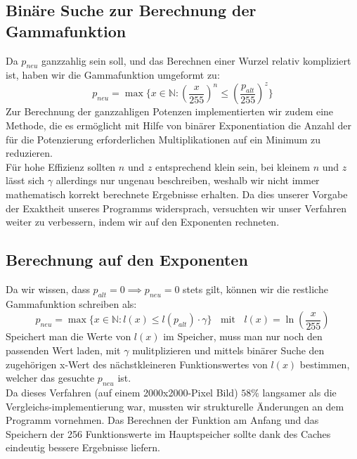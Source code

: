 \documentclass[course=erap]{aspdoc}
\begin{document}
	\subsection{Binäre Suche zur Berechnung der Gammafunktion}
	Da $p_{neu}$ ganzzahlig sein soll, und das Berechnen einer Wurzel relativ kompliziert ist, haben wir die Gammafunktion umgeformt zu:
	\begin{equation}
	\label{(5)}
	p_{neu} = \max \{ x \in \mathbb{N} :\left(\frac{x}{255}\right)^{n} \leq\left(\frac{p_{alt}}{255}\right)^{z} \}
	\end{equation}
	\noindent	
	Zur Berechnung der ganzzahligen Potenzen implementierten wir zudem eine Methode, die es ermöglicht mit Hilfe von binärer Exponentiation die Anzahl der für die Potenzierung erforderlichen Multiplikationen auf ein Minimum zu reduzieren.\\
	
	\noindent		 
	Für hohe Effizienz sollten $n$ und $z$ entsprechend klein sein, bei kleinem $n$ und $z$ lässt sich $\gamma$ allerdings nur ungenau beschreiben, weshalb wir nicht immer mathematisch korrekt berechnete Ergebnisse erhalten. Da dies unserer Vorgabe der Exaktheit unseres Programms widersprach, versuchten wir unser Verfahren weiter zu verbessern, indem wir auf den Exponenten rechneten.          
	
	\subsection{Berechnung auf den Exponenten}
	Da wir wissen, dass $p_{alt}=0 \implies p_{neu}=0$ stets gilt, können wir die restliche Gammafunktion schreiben als:
	\begin{equation}
	\label{(6)}
	    p_{neu} = \max\{x\in \mathbb{N} : l(x) \leq l(p_{alt}) \cdot \gamma\} \;\;\text{ mit } \;\; l(x) = \ln\left(\frac{x}{255}\right)
	\end{equation}
	Speichert man die Werte von $l(x)$ im Speicher, muss man nur noch den passenden Wert laden, mit $\gamma$ mulitplizieren und mittels binärer Suche den zugehörigen x-Wert des nächstkleineren Funktionswertes von $l(x)$ bestimmen, welcher das gesuchte $p_{neu}$ ist.\\
	
	\noindent
	Da dieses Verfahren (auf einem 2000x2000-Pixel Bild) $58\%$ langsamer als die Vergleichs-implementierung war, mussten wir strukturelle Änderungen an dem Programm vornehmen. Das Berechnen der Funktion am Anfang und das Speichern der 256 Funktionswerte im Hauptspeicher sollte dank des Caches eindeutig bessere Ergebnisse liefern.\\
	
\end{document}
